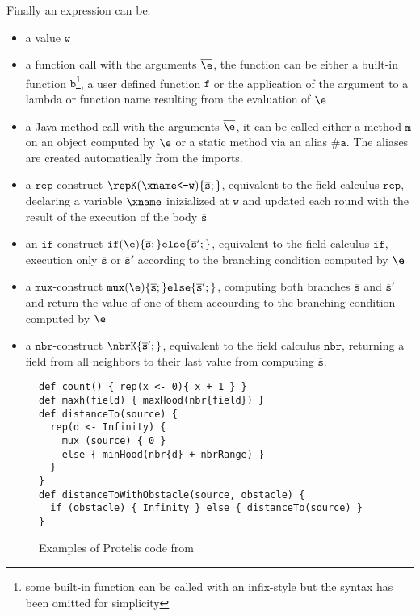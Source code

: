 Finally an expression can be:
\begin{itemize}
\item a value $\mathtt{w}$
\item a function call with the arguments $\overline{\e}$, the function can be either a built-in function $\mathtt{b}$\footnote{some built-in function can be called with an infix-style but the syntax has been omitted for simplicity}, a user defined function $\mathtt{f}$ or the application of the argument to a lambda or function name resulting from the evaluation of $\e$
\item a Java method call with the arguments $\overline{\e}$, it can be called either a method $\mathtt{m}$ on an object computed by $\e$ or a static method via an alias $\#\mathtt{a}$. The aliases are created automatically from the imports.
\item a $\mathtt{rep}$-construct $\repK(\xname\texttt{<-}\mathtt{w})\{ \overline{\mathtt{s}};\}$, equivalent to the field calculus $\mathtt{rep}$, declaring a variable $\xname$ inizialized at $\mathtt{w}$ and updated each round with the result of the execution of the body $\overline{\mathtt{s}}$
\item an $\mathtt{if}$-construct $\mathtt{if}(\e)\{\overline{\mathtt{s}};\}\mathtt{else}\{\overline{\mathtt{s}}';\}$, equivalent to the field calculus $\mathtt{if}$, execution only $\overline{\mathtt{s}}$ or $\overline{\mathtt{s}}'$ according to the branching condition computed by $\e$
\item a $\mathtt{mux}$-construct $\mathtt{mux}(\e)\{\overline{\mathtt{s}};\}\mathtt{else}\{\overline{\mathtt{s}}';\}$, computing both branches $\overline{\mathtt{s}}$ and $\overline{\mathtt{s}}'$ and return the value of one of them accourding to the branching condition computed by $\e$
\item a $\mathtt{nbr}$-construct $\nbrK\{\overline{\mathtt{s}}';\}$, equivalent to the field calculus $\mathtt{nbr}$, returning a field from all neighbors to their last value from computing $\overline{\mathtt{s}}$.
\end{itemize}

\begin{figure}[t]
\begin{lstlisting}[language={Protelis},frame=single,
  emph={count, maxh, distanceTo, distanceToWithObstacle}
]
def count() { rep(x <- 0){ x + 1 } }
def maxh(field) { maxHood(nbr{field}) }
def distanceTo(source) {
  rep(d <- Infinity) {
    mux (source) { 0 }
    else { minHood(nbr{d} + nbrRange) }
  }
}
def distanceToWithObstacle(source, obstacle) {
  if (obstacle) { Infinity } else { distanceTo(source) }
}
\end{lstlisting}
\caption{Examples of Protelis code from \cite{Protelis}}\label{fig:protelisexample}
\end{figure}

